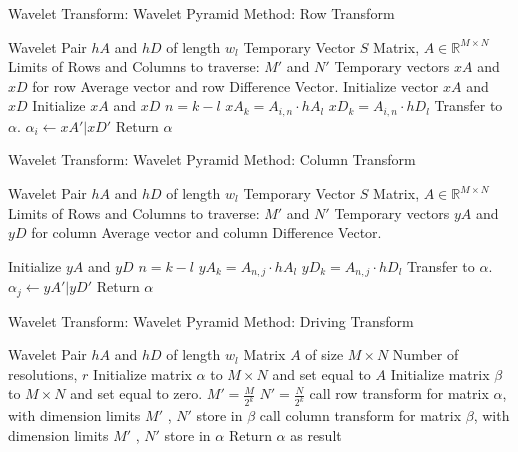 \begin{algorithm}
\caption{Wavelet Transform: Wavelet Pyramid Method: Row Transform }
\label{wpmethodrow}
\begin{algorithmic}
\REQUIRE  Wavelet Pair $hA$ and $hD$ of length $w_l$
\REQUIRE Temporary Vector $S$
\REQUIRE Matrix, $A \in {\mathbb R}^{M\times N}$
\REQUIRE Limits of Rows and Columns to traverse: $M'$ and $N'$
\REQUIRE Temporary vectors $xA$ and $xD$ for row Average vector and row Difference Vector.
\STATE Initialize vector $xA$ and $xD$
\STATE Initialize $xA$ and $xD$
\STATE $n = k - l$
\STATE $xA_k = A_{i,n} \cdot hA_l$
\STATE $xD_k = A_{i,n} \cdot hD_l$
\ENDIF
\ENDFOR
\ENDFOR
\STATE Transfer to $\alpha$.  $\alpha_i  \leftarrow xA'|xD'$
\ENDFOR
\STATE Return $\alpha$
\end{algorithmic}
\end{algorithm}

\begin{algorithm}
\caption{Wavelet Transform: Wavelet Pyramid Method: Column Transform }
\label{wpmethodcol}
\begin{algorithmic}
\REQUIRE  Wavelet Pair $hA$ and $hD$ of length $w_l$
\REQUIRE Temporary Vector $S$
\REQUIRE Matrix, $A \in {\mathbb R}^{M\times N}$
\REQUIRE Limits of Rows and Columns to traverse: $M'$ and $N'$
\REQUIRE Temporary vectors $yA$ and $yD$ for column Average vector and column Difference Vector.

\STATE Initialize $yA$ and $yD$
\STATE $n = k - l$
\STATE $yA_k = A_{n,j} \cdot hA_l$
\STATE $yD_k = A_{n,j} \cdot hD_l$
\ENDIF
\ENDFOR
\ENDFOR
\STATE Transfer to $\alpha$.  $\alpha_j  \leftarrow yA'|yD'$
\ENDFOR
\STATE Return $\alpha$
\end{algorithmic}
\end{algorithm}

\begin{algorithm}
\caption{Wavelet Transform: Wavelet Pyramid Method: Driving Transform }
\label{wpmethod}
\begin{algorithmic}
\REQUIRE  Wavelet Pair $hA$ and $hD$ of length $w_l$
\REQUIRE Matrix $A$ of size $M\times N$
\REQUIRE Number of resolutions, $r$
\STATE Initialize matrix $\alpha$ to $M\times N$ and set equal to $A$
\STATE Initialize matrix $\beta$ to $M \times N$ and set equal to zero.
\STATE $M' = \frac{M}{2^k}$
\STATE $N' = \frac{N}{2^k}$
\STATE call row transform for matrix $\alpha$, with dimension limits $M'$ , $N'$ store in $\beta$
\STATE call column transform for matrix $\beta$, with dimension limits $M'$ , $N'$ store in $\alpha$
\ENDFOR
\STATE Return $\alpha$ as result
\end{algorithmic}
\end{algorithm}



